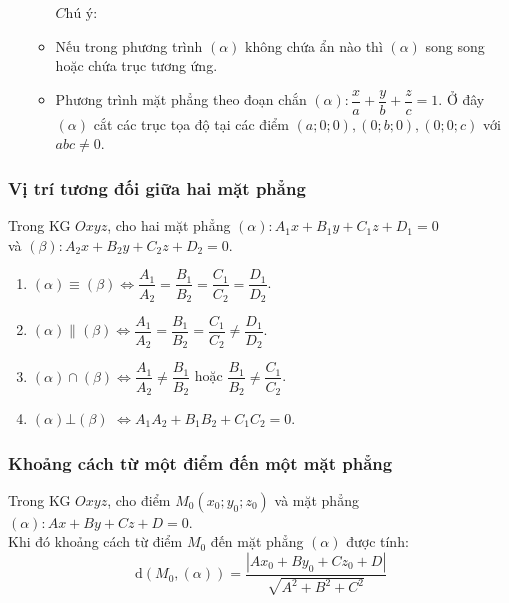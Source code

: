 \begin{tomtat}
\begin{itemize}
\begin{itemize}
\begin{center}
		\end{center} 
		$\textit{Chú ý}$:
		\item Nếu trong phương trình $(\alpha)$ không chứa ẩn nào thì $(\alpha)$ song song hoặc chứa trục tương ứng.
		\item Phương trình mặt phẳng theo đoạn chắn $\left(\alpha\right):\dfrac{x}{a}+\dfrac{y}{b}+\dfrac{z}{c}=1$. Ở đây $(\alpha)$ cắt các trục tọa độ tại các điểm $(a;0;0), (0;b;0), (0;0;c)$ với $abc\neq 0$.
	\end{itemize}
\end{itemize}
\subsubsection{Vị trí tương đối giữa hai mặt phẳng}
Trong KG $Oxyz$, cho hai mặt phẳng
$(\alpha )\colon A_1x+B_1y+C_1z+D_1=0$ \\
và $(\beta )\colon A_2x+B_2y+C_2z+D_2=0$.
\begin{enumerate}
	\item $(\alpha   )\equiv  (\beta ) $$\Leftrightarrow \dfrac{A_1}{A_2} =\dfrac{B_1}{B_2}=\dfrac{C_1}{C_2}=\dfrac{D_1}{D_2}$.
	\item $(\alpha   )\parallel  (\beta ) $$\Leftrightarrow \dfrac{A_1}{A_2} =\dfrac{B_1}{B_2}=\dfrac{C_1}{C_2}\ne \dfrac{D_1}{D_2}$.
	\item $(\alpha )\cap (\beta )$$\Leftrightarrow  \dfrac{A_1}{A_2} \ne \dfrac{B_1}{B_2}$ hoặc $\dfrac{B_1}{B_2}\ne \dfrac{C_1}{C_2}$.
	\item $(\alpha ) \bot  (\beta )$ $\Leftrightarrow A_1A_2+B_1B_2+C_1C_2=0$.
\end{enumerate}
\subsubsection{Khoảng cách từ một điểm đến một mặt phẳng}
 Trong KG $Oxyz$, cho điểm $M_0(x_0;y_0;z_0) $ và mặt phẳng $\left(\alpha\right):Ax+By+Cz+D=0$. \\Khi đó khoảng cách từ điểm $M_0$ đến mặt phẳng $(\alpha)$ được tính:\\
	$$\boxed{\mathrm{\,d}\left(M_0,\left(\alpha\right)\right)=\dfrac{\left|Ax_0+By_0+Cz_0+D\right|}{\sqrt{A^2+B^2+C^2}}}$$


\end{tomtat}
